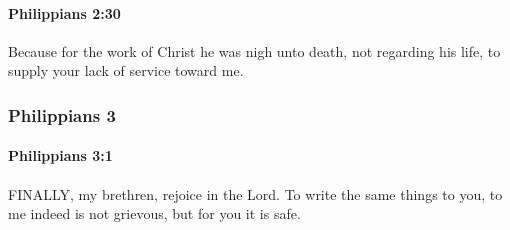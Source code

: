 		\paragraph{Philippians 2:30} %
			\label{PHILIPPIANS-2-30}

			Because for the work of Christ he was nigh unto death, not regarding his life, to supply your lack of service toward me.

			\begin{framed}
			\scriptsize
				\begin{compactdesc}
					\item[SBLG] 
				\end{compactdesc}
			\end{framed}

	\subsubsection{Philippians 3} %
		\label{PHILIPPIANS-3}
		
		\paragraph{Philippians 3:1} %
			\label{PHILIPPIANS-3-1}

			FINALLY, my brethren, rejoice in the Lord.  To write the same things to you, to me indeed is not grievous, but for you it is safe.

